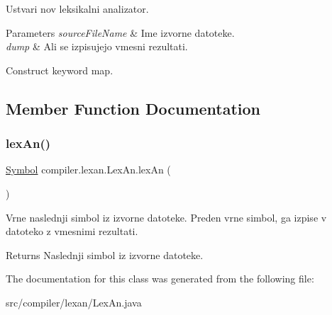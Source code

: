Ustvari nov leksikalni analizator.


\begin{DoxyParams}{Parameters}
{\em source\+File\+Name} & Ime izvorne datoteke. \\
\hline
{\em dump} & Ali se izpisujejo vmesni rezultati. \\
\hline
\end{DoxyParams}
Construct keyword map.

\subsection{Member Function Documentation}
\mbox{\label{classcompiler_1_1lexan_1_1_lex_an_a60948e843ca8cdf9d6c9b28c5aa8193e}} 
\subsubsection{\texorpdfstring{lex\+An()}{lexAn()}}
{\footnotesize\ttfamily \hyperlink{classcompiler_1_1lexan_1_1_symbol}{Symbol} compiler.\+lexan.\+Lex\+An.\+lex\+An (\begin{DoxyParamCaption}{ }\end{DoxyParamCaption})}

Vrne naslednji simbol iz izvorne datoteke. Preden vrne simbol, ga izpise v datoteko z vmesnimi rezultati.

\begin{DoxyReturn}{Returns}
Naslednji simbol iz izvorne datoteke. 
\end{DoxyReturn}


The documentation for this class was generated from the following file\+:\begin{DoxyCompactItemize}
\item 
src/compiler/lexan/Lex\+An.\+java\end{DoxyCompactItemize}
